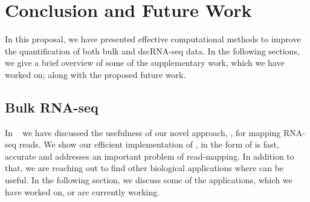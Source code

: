 
\chapter{Conclusion and Future Work} %
\label{conclusion} %



In this proposal, we have presented effective computational methods to improve the quantification 
of both bulk and dscRNA-seq data. In the following sections, we
give a brief overview of some of the supplementary work, which we have worked on;
along with the proposed future work.

\section{Bulk RNA-seq}

In ~ we have discussed the usefulness of our novel approach, \qm, 
for mapping RNA-seq reads. We show our efficient implementation of \qm, in the 
form of \rapmap is fast, accurate and addresses an important problem of read-mapping. 
In addition to that, we are reaching out to find other biological applications where 
\rapmap can be useful. In the following section, we discuss some of the applications, 
which we have worked on, or are currently working. 

